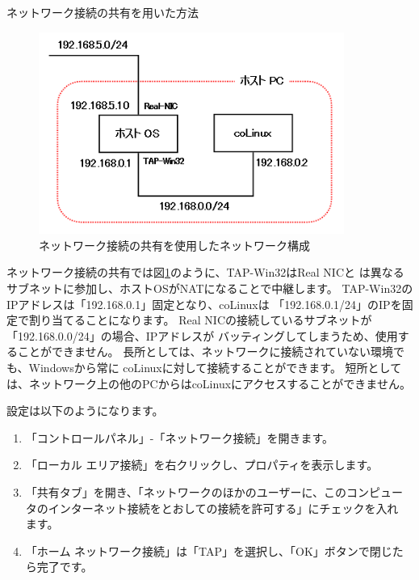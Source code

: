 \documentclass[mingoth,a4paper]{jsarticle}
\begin{document}
ネットワーク接続の共有を用いた方法

\begin{figure}[htbp]
 \begin{center}
  \includegraphics[width=100mm]{image200804/colinux_ics.png}
 \end{center}
 \caption{ネットワーク接続の共有を使用したネットワーク構成}
 \label{fig:ics}
\end{figure}

ネットワーク接続の共有では図\ref{fig:ics}のように、TAP-Win32はReal NICと
は異なるサブネットに参加し、ホストOSがNATになることで中継します。
TAP-Win32のIPアドレスは「192.168.0.1」固定となり、coLinuxは
「192.168.0.1/24」のIPを固定で割り当てることになります。
Real NICの接続しているサブネットが「192.168.0.0/24」の場合、IPアドレスが
バッティングしてしまうため、使用することができません。
長所としては、ネットワークに接続されていない環境でも、Windowsから常に
coLinuxに対して接続することができます。
短所としては、ネットワーク上の他のPCからはcoLinuxにアクセスすることができません。

設定は以下のようになります。
\begin{enumerate}
\item 「コントロールパネル」-「ネットワーク接続」を開きます。
\item 「ローカル エリア接続」を右クリックし、プロパティを表示します。
\item 「共有タブ」を開き、「ネットワークのほかのユーザーに、このコンピュー
      タのインターネット接続をとおしての接続を許可する」にチェックを入れ
      ます。
\item 「ホーム ネットワーク接続」は「TAP」を選択し、「OK」ボタンで閉じたら完了です。
\end{enumerate}
\end{document}
